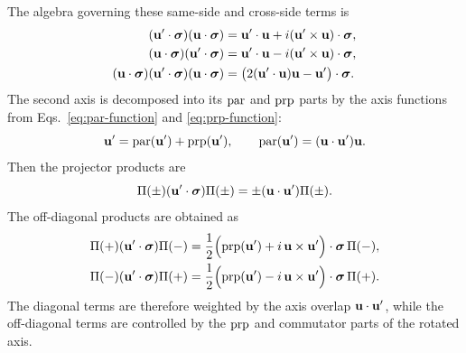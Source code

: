 The algebra governing these same-side and cross-side terms is
\begin{align*}
(\mathbf{u}'\cdot\mathbf{\bm{\sigma}})(\mathbf{u}\cdot\mathbf{\bm{\sigma}})
&=\mathbf{u}'\cdot\mathbf{u}+i(\mathbf{u}'\times\mathbf{u})\cdot\mathbf{\bm{\sigma}},\\
(\mathbf{u}\cdot\mathbf{\bm{\sigma}})(\mathbf{u}'\cdot\mathbf{\bm{\sigma}})
&=\mathbf{u}'\cdot\mathbf{u}-i(\mathbf{u}'\times\mathbf{u})\cdot\mathbf{\bm{\sigma}},\\
(\mathbf{u}\cdot\mathbf{\bm{\sigma}})(\mathbf{u}'\cdot\mathbf{\bm{\sigma}})(\mathbf{u}\cdot\mathbf{\bm{\sigma}})
&=\bigl(2(\mathbf{u}'\cdot\mathbf{u})\mathbf{u}-\mathbf{u}'\bigr)\cdot\mathbf{\bm{\sigma}}.
\end{align*}
The second axis is decomposed into its \(\operatorname{par}\) and
\(\operatorname{prp}\) parts by the axis functions from
Eqs.\ \eqref{eq:par-function} and \eqref{eq:prp-function}:
\begin{equation*}
\mathbf{u}'=\operatorname{par}(\mathbf{u}')+\operatorname{prp}(\mathbf{u}'),
\qquad
\operatorname{par}(\mathbf{u}')=(\mathbf{u}\cdot\mathbf{u}')\mathbf{u}.
\end{equation*}
Then the projector products are
\begin{equation*}
\Pi(\pm)(\mathbf{u}'\cdot\mathbf{\bm{\sigma}})\Pi(\pm)=\pm(\mathbf{u}\cdot\mathbf{u}')\Pi(\pm).
\end{equation*}
The off-diagonal products are obtained as
\begin{equation*}
\begin{aligned}
\Pi(+)(\mathbf{u}'\cdot\mathbf{\bm{\sigma}})\Pi(-)
&=\frac12\Bigl(\operatorname{prp}(\mathbf{u}')
+i\,\mathbf{u}\times\mathbf{u}'\Bigr)\cdot\mathbf{\bm{\sigma}}\,\Pi(-),\\
\Pi(-)(\mathbf{u}'\cdot\mathbf{\bm{\sigma}})\Pi(+)
&=\frac12\Bigl(\operatorname{prp}(\mathbf{u}')
-i\,\mathbf{u}\times\mathbf{u}'\Bigr)\cdot\mathbf{\bm{\sigma}}\,\Pi(+).
\end{aligned}
\end{equation*}
The diagonal terms are therefore weighted by the axis overlap
\(\mathbf{u}\cdot\mathbf{u}'\), while the off-diagonal terms are controlled by the
\(\operatorname{prp}\) and commutator parts of the rotated axis.


